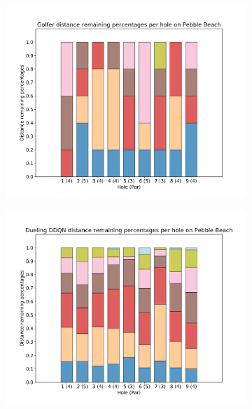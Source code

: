 \documentclass{kththesis}
\begin{document}
\begin{figure}
    \centering
    \begin{subfigure}{\textwidth}
    \centering
    \includegraphics[height=0.3\textheight]{L2Percentages/L2_Distance_Percentages_Pebble.png} 
    \end{subfigure}
    \begin{subfigure}{\textwidth}
    \centering
    \includegraphics[height=0.3\textheight]{AgentPercentages/DDDQN_Distance_Percentages_Pebble.png} 
    \end{subfigure}
    \begin{subfigure}{\textwidth}

\end{subfigure}
\end{figure}
\end{document}
